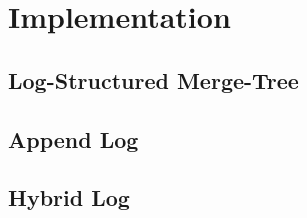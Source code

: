 
\chapter{Implementation}

\label{Chapter3}

\section{Log-Structured Merge-Tree}





\section{Append Log}



\section{Hybrid Log}

